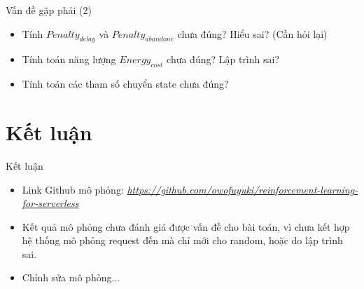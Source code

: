 \documentclass[10pt,aspectratio=169]{beamer}
\begin{document}
\begin{frame}{Vấn đề gặp phải (2)}{\subsecname}
\begin{itemize}
\setlength\itemsep{8pt}
\item Tính $ Penalty_{delay} $ và $ Penalty_{abandone} $ chưa đúng? Hiểu sai? (Cần hỏi lại)
\item Tính toán năng lượng $ Energy_{cost} $ chưa đúng? Lập trình sai?
\item Tính toán các tham số chuyển state chưa đúng?
\end{itemize}
\end{frame}

\section{Kết luận}

\begin{frame}{Kết luận}
\begin{itemize}
\setlength\itemsep{8pt}
\item Link Github mô phỏng: \textit{
\href{https://github.com/owofuyuki/reinforcement-learning-for-serverless}{https://github.com/owofuyuki/reinforcement-learning-for-serverless}}
\item Kết quả mô phỏng chưa đánh giá được vấn đề cho bài toán, vì chưa kết hợp hệ thống mô phỏng request đến mà chỉ mới cho random, hoặc do lập trình sai.
\item Chỉnh sửa mô phỏng...
\end{itemize}
\end{frame}

\backmatter
\end{document}
